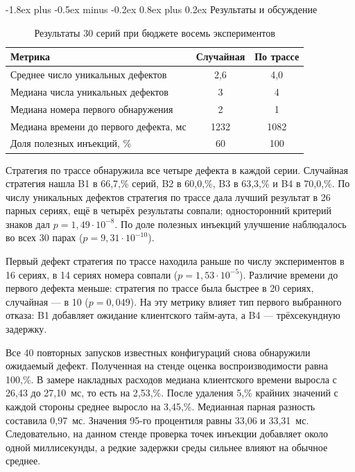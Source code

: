 \documentclass[10pt,a4paper]{article}
\makeatletter
\renewcommand\section{\@startsection{section}{1}{\z@}%
  {-1.8ex plus -0.5ex minus -0.2ex}%
  {0.8ex plus 0.2ex}%
  {\normalfont\Large\bfseries}}
\makeatother
\begin{document}
\section{Результаты и обсуждение}

\begin{table}[ht]
  \centering
  \caption{Результаты 30 серий при бюджете восемь экспериментов}
  \label{tab:results}
  \begin{tabular}{>{\raggedright\arraybackslash}p{}cc}
    \toprule
    Метрика & Случайная & По трассе \\
    \midrule
    Среднее число уникальных дефектов & 2,6 & 4,0 \\
    Медиана числа уникальных дефектов & 3 & 4 \\
    Медиана номера первого обнаружения & 2 & 1 \\
    Медиана времени до первого дефекта, мс & 1232 & 1082 \\
    Доля полезных инъекций, \% & 60 & 100 \\
    \bottomrule
  \end{tabular}
\end{table}

Стратегия по трассе обнаружила все четыре дефекта в каждой серии. Случайная стратегия нашла B1 в 66,7,\% серий, B2 в 60,0,\%, B3 в 63,3,\% и B4 в 70,0,\%. По числу уникальных дефектов стратегия по трассе дала лучший результат в 26 парных сериях, ещё в четырёх результаты совпали; односторонний критерий знаков дал $p=1{,}49\cdot10^{-8}$. По доле полезных инъекций улучшение наблюдалось во всех 30 парах ($p=9{,}31\cdot10^{-10}$).

Первый дефект стратегия по трассе находила раньше по числу экспериментов в 16 сериях, в 14 сериях номера совпали ($p=1{,}53\cdot10^{-5}$). Различие времени до первого дефекта меньше: стратегия по трассе была быстрее в 20 сериях, случайная --- в 10 ($p=0{,}049$). На эту метрику влияет тип первого выбранного отказа: B1 добавляет ожидание клиентского тайм-аута, а B4 --- трёхсекундную задержку.

Все 40 повторных запусков известных конфигураций снова обнаружили ожидаемый дефект. Полученная на стенде оценка воспроизводимости равна 100,\%. В замере накладных расходов медиана клиентского времени выросла с 26,43 до 27,10~мс, то есть на 2,53,\%. После удаления 5,\% крайних значений с каждой стороны среднее выросло на 3,45,\%. Медианная парная разность составила 0,97~мс. Значения 95-го процентиля равны 33,06 и 33,31~мс. Следовательно, на данном стенде проверка точек инъекции добавляет около одной миллисекунды, а редкие задержки среды сильнее влияют на обычное среднее.
\end{document}
